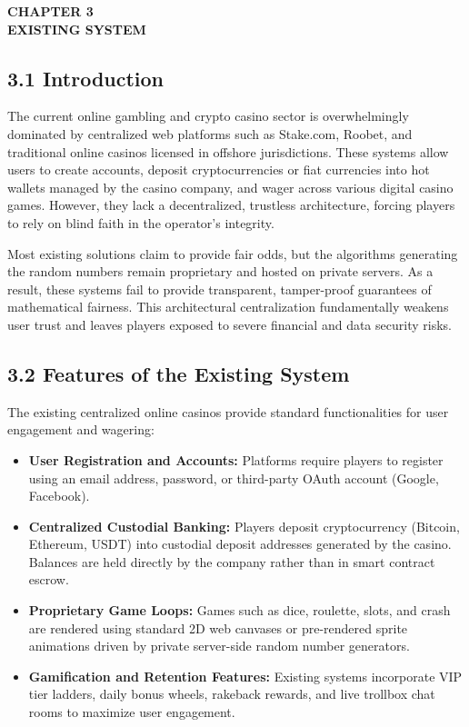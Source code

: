 \vspace*{0.5cm}
\begin{center}
\textbf{CHAPTER 3}\\[0.15cm]
\textbf{EXISTING SYSTEM}
\end{center}
\label{chap:existing}
\vspace{0.2cm}

\subsection*{3.1 Introduction}
The current online gambling and crypto casino sector is overwhelmingly dominated by centralized web platforms such as Stake.com, Roobet, and traditional online casinos licensed in offshore jurisdictions. These systems allow users to create accounts, deposit cryptocurrencies or fiat currencies into hot wallets managed by the casino company, and wager across various digital casino games. However, they lack a decentralized, trustless architecture, forcing players to rely on blind faith in the operator's integrity.

Most existing solutions claim to provide fair odds, but the algorithms generating the random numbers remain proprietary and hosted on private servers. As a result, these systems fail to provide transparent, tamper-proof guarantees of mathematical fairness. This architectural centralization fundamentally weakens user trust and leaves players exposed to severe financial and data security risks.

\subsection*{3.2 Features of the Existing System}
The existing centralized online casinos provide standard functionalities for user engagement and wagering:
\begin{itemize}[leftmargin=1.5em]
    \item \textbf{User Registration and Accounts:} Platforms require players to register using an email address, password, or third-party OAuth account (Google, Facebook).
    \item \textbf{Centralized Custodial Banking:} Players deposit cryptocurrency (Bitcoin, Ethereum, USDT) into custodial deposit addresses generated by the casino. Balances are held directly by the company rather than in smart contract escrow.
    \item \textbf{Proprietary Game Loops:} Games such as dice, roulette, slots, and crash are rendered using standard 2D web canvases or pre-rendered sprite animations driven by private server-side random number generators.
    \item \textbf{Gamification and Retention Features:} Existing systems incorporate VIP tier ladders, daily bonus wheels, rakeback rewards, and live trollbox chat rooms to maximize user engagement.
\end{itemize}

